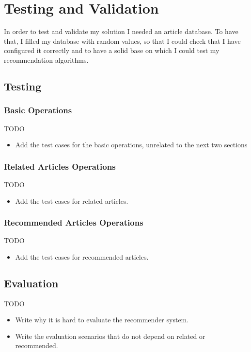 \chapter{Testing and Validation}
\label{chapter:testing-validation}

In order to test and validate my solution I needed an article database. To have that, I filled my database with random values, so that I could check that I have configured it correctly and to have a solid base on which I could test my recommendation algorithms.

\section{Testing} 
\label{sec:testing}

\subsection{Basic Operations} 
\label{sec:basic-operations}
TODO
\begin{itemize}
	\item Add the test cases for the basic operations, unrelated to the next two sections
\end{itemize}

\subsection{Related Articles Operations} 
\label{sec:related-articles-operations}
TODO
\begin{itemize}
	\item Add the test cases for related articles.
\end{itemize}

\subsection{Recommended Articles Operations} 
\label{sec:recommended-articles-operations}
TODO
\begin{itemize}
	\item Add the test cases for recommended articles.
\end{itemize}

\section{Evaluation} 
\label{sec:evaluation}
TODO
\begin{itemize}
	\item Write why it is hard to evaluate the recommender system.
	\item Write the evaluation scenarios that do not depend on related or recommended.
\end{itemize}

